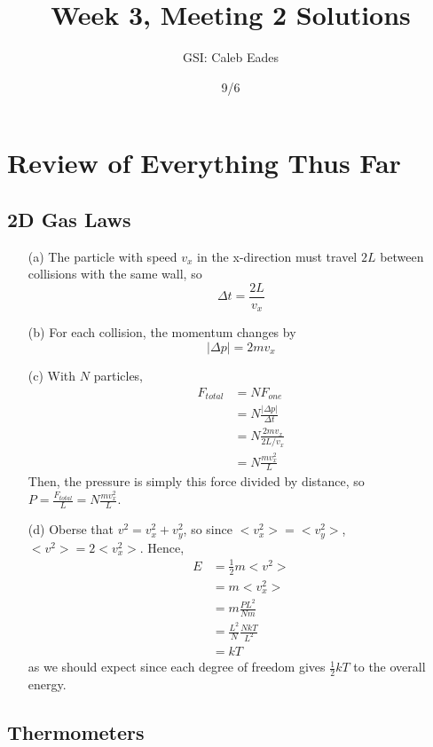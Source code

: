 \documentclass{article}
\begin{document}
	
\title{Week 3, Meeting 2 Solutions}
\author{GSI: Caleb Eades}
\date{9/6}
\maketitle

\section{Review of Everything Thus Far}

\subsection{2D Gas Laws}

\begin{itemize}
	\item[(a)] The particle with speed $v_x$ in the x-direction must travel $2L$ between collisions with the same wall, so
	\begin{equation}
	\Delta t = \frac{2L}{v_x}
	\end{equation}
	\item[(b)] For each collision, the momentum changes by
	\begin{equation}
	|\Delta p| = 2mv_x
	\end{equation}
	\item[(c)] With $N$ particles,
	\begin{align*}
	F_{total} &= NF_{one} \\
	&= N\frac{|\Delta p|}{\Delta t} \\
	&= N\frac{2mv_x}{2L/v_x} \\
	&= N\frac{mv_x^2}{L}
	\end{align*}
	Then, the pressure is simply this force divided by distance, so $P = \frac{F_{total}}{L} = N\frac{mv_x^2}{L}$.
	\item[(d)] Oberse that $v^2 = v_x^2 + v_y^2$, so since $<v_x^2> = <v_y^2>$, $<v^2> = 2<v_x^2>$. Hence,
	\begin{align*}
	E &= \frac{1}{2}m<v^2> \\
	&= m<v_x^2> \\
	&= m\frac{PL^2}{Nm} \\
	&= \frac{L^2}{N}\frac{NkT}{L^2} \\
	&= kT
	\end{align*}
	as we should expect since each degree of freedom gives $\frac{1}{2}kT$ to the overall energy.
\end{itemize}

\subsection{Thermometers}
\end{document}
